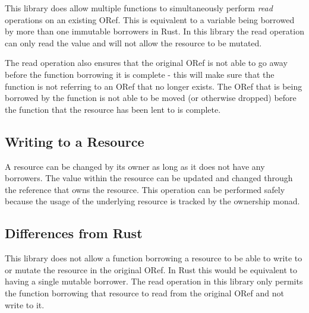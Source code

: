 \documentclass[onehalf,11pt]{beavtex}
\begin{document}
This library does allow multiple functions to simultaneously perform
\textit{read} operations on an existing ORef.
This is equivalent to a variable being borrowed by more than one immutable
borrowers in Rust.  In this library the read operation can only read the value
and will not allow the resource to be mutated.

The read operation also ensures that the original ORef is not able to go away
before the function borrowing it is complete - this will make sure that the
function is not referring to an ORef that no longer exists.  The ORef that is
being borrowed by the function is not able to be moved (or otherwise dropped)
before the function that the resource has been lent to is complete.

\subsection{Writing to a Resource}

A resource can be changed by its owner as long as it does not have any borrowers.
The value within the resource can be updated and changed through the reference
that owns the resource. This operation can be performed safely because the usage
of the underlying resource is tracked by the ownership monad.



\subsection{Differences from Rust}

This library does not allow a function borrowing a resource to be able to
write to or mutate the resource in the original ORef.  In Rust this would be
equivalent to having a single mutable borrower. The read operation in this
library only permits the function borrowing that resource to read from the
original ORef and not write to it.

%
\end{document}
